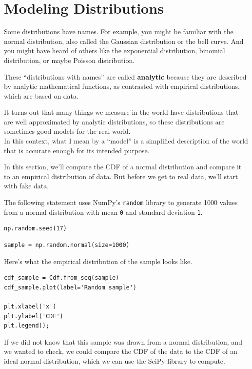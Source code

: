 \hypertarget{modeling-distributions}{%
\section{Modeling Distributions}\label{modeling-distributions}}

Some distributions have names. For example, you might be familiar with
the normal distribution, also called the Gaussian distribution or the
bell curve. And you might have heard of others like the exponential
distribution, binomial distribution, or maybe Poisson distribution.

These ``distributions with names'' are called \textbf{analytic} because
they are described by analytic mathematical functions, as contrasted
with empirical distributions, which are based on data.

It turns out that many things we measure in the world have distributions
that are well approximated by analytic distributions, so these
distributions are sometimes good models for the real world.\\
In this context, what I mean by a ``model'' is a simplified description
of the world that is accurate enough for its intended purpose.

In this section, we'll compute the CDF of a normal distribution and
compare it to an empirical distribution of data. But before we get to
real data, we'll start with fake data.

The following statement uses NumPy's \passthrough{\lstinline!random!}
library to generate 1000 values from a normal distribution with mean
\passthrough{\lstinline!0!} and standard deviation
\passthrough{\lstinline!1!}.

\begin{lstlisting}[]
np.random.seed(17)
\end{lstlisting}

\begin{lstlisting}[]
sample = np.random.normal(size=1000)
\end{lstlisting}

Here's what the empirical distribution of the sample looks like.

\begin{lstlisting}[]
cdf_sample = Cdf.from_seq(sample)
cdf_sample.plot(label='Random sample')

plt.xlabel('x')
plt.ylabel('CDF')
plt.legend();
\end{lstlisting}

If we did not know that this sample was drawn from a normal
distribution, and we wanted to check, we could compare the CDF of the
data to the CDF of an ideal normal distribution, which we can use the
SciPy library to compute.

